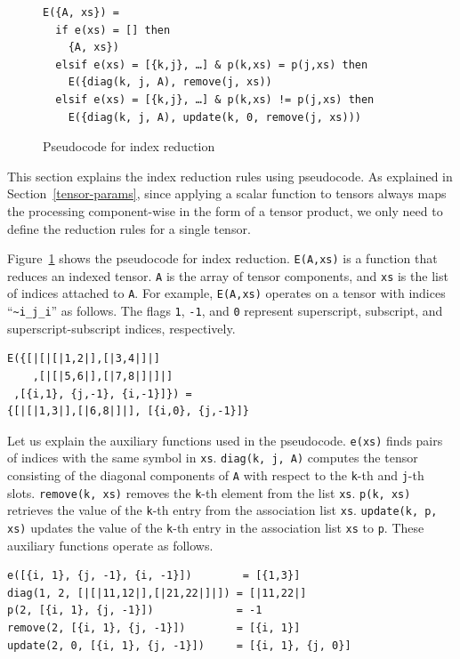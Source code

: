 \begin{figure}
  \begin{center}
\begin{lstlisting}[language=egison,numbers=none]
E({A, xs}) =
  if e(xs) = [] then
    {A, xs})
  elsif e(xs) = [{k,j}, …] & p(k,xs) = p(j,xs) then
    E({diag(k, j, A), remove(j, xs))
  elsif e(xs) = [{k,j}, …] & p(k,xs) != p(j,xs) then
    E({diag(k, j, A), update(k, 0, remove(j, xs)))
\end{lstlisting}
  \end{center}
  \caption{Pseudocode for index reduction}
  \label{fig:semanticsRules}
\end{figure}

This section explains the index reduction rules using pseudocode.
As explained in Section~\ref{tensor-params}, since applying a scalar function to tensors always maps the processing component-wise in the form of a tensor product, we only need to define the reduction rules for a single tensor.

Figure~\ref{fig:semanticsRules} shows the pseudocode for index reduction.
\lstinline{E(A,xs)} is a function that reduces an indexed tensor.
\lstinline{A} is the array of tensor components, and \lstinline{xs} is the list of indices attached to \lstinline{A}.
For example, \lstinline{E(A,xs)} operates on a tensor with indices ``\lstinline|~i_j_i|'' as follows.
The flags \lstinline{1}, \lstinline{-1}, and \lstinline{0} represent superscript, subscript, and superscript-subscript indices, respectively.
\begin{lstlisting}[language=egison,numbers=none]
E({[|[|[|1,2|],[|3,4|]|]
    ,[|[|5,6|],[|7,8|]|]|]
 ,[{i,1}, {j,-1}, {i,-1}]}) =
{[|[|1,3|],[|6,8|]|], [{i,0}, {j,-1}]}
\end{lstlisting}
Let us explain the auxiliary functions used in the pseudocode.
\lstinline{e(xs)} finds pairs of indices with the same symbol in \lstinline{xs}.
\lstinline{diag(k, j, A)} computes the tensor consisting of the diagonal components of \lstinline{A} with respect to the \lstinline{k}-th and \lstinline{j}-th slots.
\lstinline{remove(k, xs)} removes the \lstinline{k}-th element from the list \lstinline{xs}.
\lstinline{p(k, xs)} retrieves the value of the \lstinline{k}-th entry from the association list \lstinline{xs}.
\lstinline{update(k, p, xs)} updates the value of the \lstinline{k}-th entry in the association list \lstinline{xs} to \lstinline{p}.
These auxiliary functions operate as follows.
\begin{lstlisting}[language=egison,numbers=none]
e([{i, 1}, {j, -1}, {i, -1}])        = [{1,3}]
diag(1, 2, [|[|11,12|],[|21,22|]|]) = [|11,22|]
p(2, [{i, 1}, {j, -1}])             = -1
remove(2, [{i, 1}, {j, -1}])        = [{i, 1}]
update(2, 0, [{i, 1}, {j, -1}])     = [{i, 1}, {j, 0}]
\end{lstlisting}

